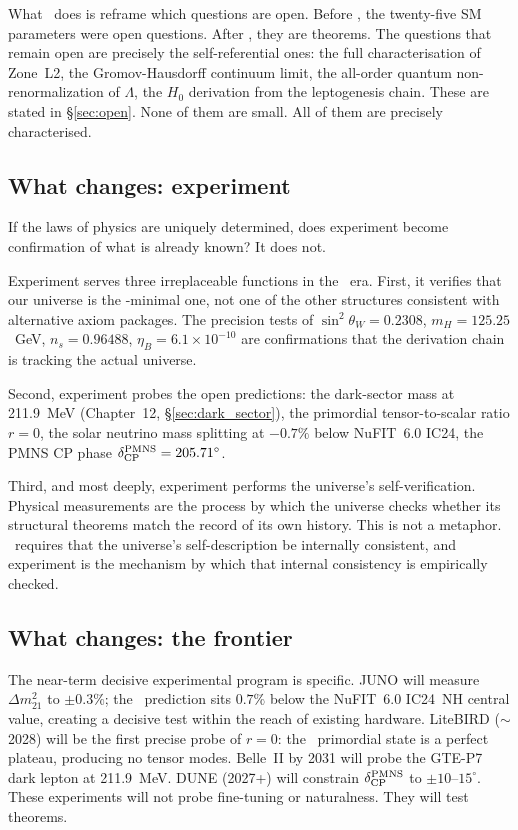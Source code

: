 \documentclass[11pt,openany]{book}
\theoremstyle{remark}
\newcommand{\GTE}{\text{GTE}}
\newcommand{\PSC}{\text{PSC}}
\newcommand{\ns}{n_s}
\newcommand{\sigW}{\sin^2\!\theta_W}
\begin{document}
What \GTE\ does is reframe which questions are open. Before \GTE, the twenty-five SM
parameters were open questions. After \GTE, they are theorems. The questions that
remain open are precisely the self-referential ones: the full characterisation of
Zone~L2, the Gromov-Hausdorff continuum limit, the all-order quantum
non-renormalization of $\Lambda$, the $H_0$ derivation from the leptogenesis chain.
These are stated in \S\ref{sec:open}. None of them are small. All of them are
precisely characterised.

\subsection*{What changes: experiment}

If the laws of physics are uniquely determined, does experiment become confirmation
of what is already known? It does not.

Experiment serves three irreplaceable functions in the \GTE\ era. First, it
verifies that our universe is the \PSC-minimal one, not one of the other structures
consistent with alternative axiom packages. The precision tests of
$\sigW = 0.2308$, $m_H = 125.25$~GeV, $\ns = 0.96488$, $\eta_B = 6.1 \times 10^{-10}$
are confirmations that the derivation chain is tracking the actual universe.

Second, experiment probes the open predictions: the dark-sector mass at 211.9~MeV
(Chapter~12, \S\ref{sec:dark_sector}), the primordial tensor-to-scalar ratio $r = 0$,
the solar neutrino mass splitting at $-0.7\%$ below NuFIT~6.0 IC24, the PMNS CP
phase $\delta^{\rm PMNS}_{\rm CP} = 205.71^\circ$.

Third, and most deeply, experiment performs the universe's self-verification.
Physical measurements are the process by which the universe checks whether its
structural theorems match the record of its own history. This is not a metaphor.
\PSC\ requires that the universe's self-description be internally consistent, and
experiment is the mechanism by which that internal consistency is empirically checked.

\subsection*{What changes: the frontier}

The near-term decisive experimental program is specific. JUNO will measure
$\Delta m^2_{21}$ to $\pm 0.3\%$; the \GTE\ prediction sits $0.7\%$ below the
NuFIT~6.0 IC24~NH central value, creating a decisive test within the reach of
existing hardware. LiteBIRD ($\sim$2028) will be the first precise probe of $r = 0$:
the \GTE\ primordial state is a perfect plateau, producing no tensor modes.
Belle~II by 2031 will probe the GTE-P7 dark lepton at 211.9~MeV. DUNE (2027+)
will constrain $\delta^{\rm PMNS}_{\rm CP}$ to $\pm 10$--$15^\circ$. These
experiments will not probe fine-tuning or naturalness. They will test theorems.
\end{document}
